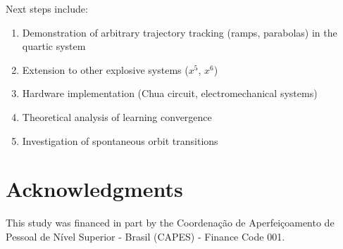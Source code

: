 \documentclass[twocolumn]{article}
\begin{document}
Next steps include:
\begin{enumerate}
    \item Demonstration of arbitrary trajectory tracking
    (ramps, parabolas) in the quartic system
    
    \item Extension to other explosive systems ($x^5$, $x^6$)
    
    \item Hardware implementation (Chua circuit, electromechanical 
    systems)
    
    \item Theoretical analysis of learning convergence
    
    \item Investigation of spontaneous orbit transitions
\end{enumerate}

\section*{Acknowledgments}

This study was financed in part by the Coordenação de Aperfeiçoamento de Pessoal de Nível Superior - Brasil (CAPES) - Finance Code 001.



\end{document}
